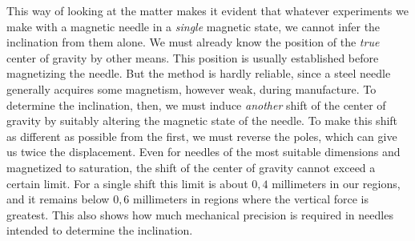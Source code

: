 This way of looking at the matter makes it evident that whatever experiments we make with a magnetic needle in a \textit{single} magnetic state, we cannot infer the inclination from them alone. We must already know the position of the \textit{true} center of gravity by other means. This position is usually established before magnetizing the needle. But the method is hardly reliable, since a steel needle generally acquires some magnetism, however weak, during manufacture. To determine the inclination, then, we must induce \textit{another} shift of the center of gravity by suitably altering the magnetic state of the needle. To make this shift as different as possible from the first, we must reverse the poles, which can give us twice the displacement. Even for needles of the most suitable dimensions and magnetized to saturation, the shift of the center of gravity cannot exceed a certain limit. For a single shift this limit is about $0{,}4$ millimeters in our regions, and it remains below $0{,}6$ millimeters in regions where the vertical force is greatest. This also shows how much mechanical precision is required in needles intended to determine the inclination.

